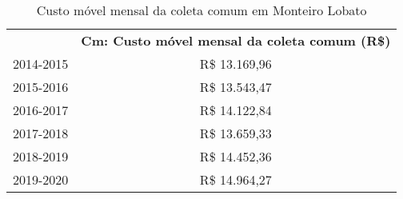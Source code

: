 \begin{table}[htbp]
  \centering
  \caption{Custo móvel mensal da coleta comum em Monteiro Lobato}
    \begin{tabular}{cc}
    \rowcolor[rgb]{ .969,  .588,  .275} \multicolumn{1}{p{6.635em}}{\textcolor[rgb]{ 1,  1,  1}{\textbf{Período}}} & \multicolumn{1}{p{15.455em}}{\textcolor[rgb]{ 1,  1,  1}{\textbf{Cm: Custo móvel mensal da coleta comum (R\$)}}} \\
    \rowcolor[rgb]{ .992,  .914,  .851} 2014-2015 & R\$ 13.169,96 \\
    \rowcolor[rgb]{ .984,  .831,  .706} 2015-2016 & R\$ 13.543,47 \\
    \rowcolor[rgb]{ .992,  .914,  .851} 2016-2017 & R\$ 14.122,84 \\
    \rowcolor[rgb]{ .984,  .831,  .706} 2017-2018 & R\$ 13.659,33 \\
    \rowcolor[rgb]{ .992,  .914,  .851} 2018-2019 & R\$ 14.452,36 \\
    \rowcolor[rgb]{ .984,  .831,  .706} 2019-2020 & R\$ 14.964,27 \\
    \end{tabular}%
  \label{tab:custos_movel_mensal}%
\end{table}%